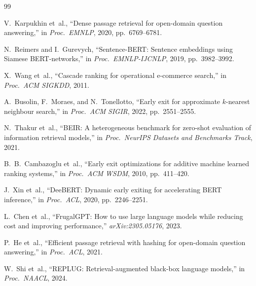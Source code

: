 \documentclass[journal]{IEEEtran}
\begin{document}
\begin{thebibliography}{99}

V.~Karpukhin et~al.,
``Dense passage retrieval for open-domain question answering,''
in \emph{Proc.\ EMNLP}, 2020, pp.~6769--6781.

N.~Reimers and I.~Gurevych,
``Sentence-BERT: Sentence embeddings using Siamese BERT-networks,''
in \emph{Proc.\ EMNLP-IJCNLP}, 2019, pp.~3982--3992.

X.~Wang et~al.,
``Cascade ranking for operational e-commerce search,''
in \emph{Proc.\ ACM SIGKDD}, 2011.

A.~Busolin, F.~Moraes, and N.~Tonellotto,
``Early exit for approximate $k$-nearest neighbour search,''
in \emph{Proc.\ ACM SIGIR}, 2022, pp.~2551--2555.

N.~Thakur et~al.,
``BEIR: A heterogeneous benchmark for zero-shot evaluation
of information retrieval models,''
in \emph{Proc.\ NeurIPS Datasets and Benchmarks Track}, 2021.

B.~B.~Cambazoglu et~al.,
``Early exit optimizations for additive machine learned ranking
systems,''
in \emph{Proc.\ ACM WSDM}, 2010, pp.~411--420.

J.~Xin et~al.,
``DeeBERT: Dynamic early exiting for accelerating BERT inference,''
in \emph{Proc.\ ACL}, 2020, pp.~2246--2251.

L.~Chen et~al.,
``FrugalGPT: How to use large language models while reducing
cost and improving performance,''
\emph{arXiv:2305.05176}, 2023.

P.~He et~al.,
``Efficient passage retrieval with hashing for open-domain
question answering,''
in \emph{Proc.\ ACL}, 2021.

W.~Shi et~al.,
``REPLUG: Retrieval-augmented black-box language models,''
in \emph{Proc.\ NAACL}, 2024.

\end{thebibliography}
\end{document}
